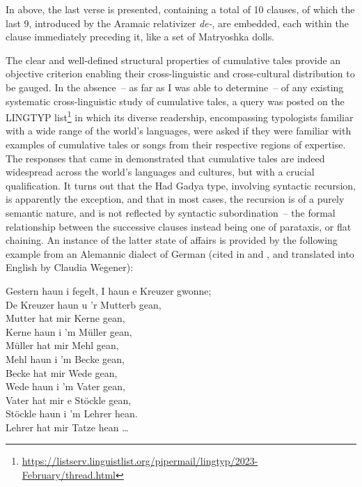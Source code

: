 \documentclass[output=paper]{langscibook}
\begin{document}
\z

In  above, the last verse is presented, containing a total of 10 clauses, of which the last 9, introduced by the Aramaic relativizer \textit{de-}, are embedded, each within the clause immediately preceding it, like a set of Matryoshka dolls.  

The clear and well-defined structural properties of cumulative tales provide an objective criterion enabling their cross-linguistic and cross-cultural distribution to be gauged.  In the absence~– as far as I was able to determine~– of any existing systematic cross-linguistic study of cumulative tales, a query was posted on the LINGTYP list\footnote{\url{https://listserv.linguistlist.org/pipermail/lingtyp/2023-February/thread.html}} in which its diverse readership, encompassing typologists familiar with a wide range of the world's languages, were asked if they were familiar with examples of cumulative  tales or songs from their respective regions of expertise.  The responses that came in demonstrated that cumulative tales are indeed widespread across the world's languages and cultures, but with a crucial qualification.  It turns out that the Had Gadya type, involving syntactic recursion, is apparently the exception, and that in most cases, the recursion is of a purely semantic nature, and is not reflected by syntactic subordination~– the formal relationship between the successive clauses instead being one of parataxis, or flat chaining.  An instance of the latter state of affairs is provided by the following example from an Alemannic dialect of German (cited in 
\cite[65]{meier1851deutsche} and \cite[39]{newell1905passover}, and translated into English by Claudia Wegener):

\ea \label{ex:gil:11}

Gestern haun i fegelt, I haun e Kreuzer gwonne;\\
De Kreuzer haun u 'r Mutterb gean,\\
Mutter hat mir Kerne gean,\\
Kerne haun i 'm Müller gean,\\
Müller hat mir Mehl gean,\\
Mehl haun i 'm Becke gean,\\
Becke hat mir Wede gean,\\
Wede haun i 'm Vater gean,\\
Vater hat mir e Stöckle gean,\\
Stöckle haun i 'm Lehrer hean.\\
Lehrer hat mir Tatze hean  \ldots \\
 
\end{document}

